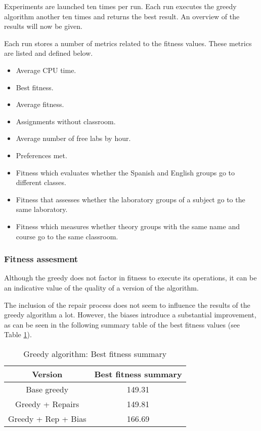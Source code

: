 Experiments are launched ten times per run. Each run executes the greedy algorithm another ten times and returns the best result. An overview of the results will now be given.


Each run stores a number of metrics related to the fitness values. These metrics are listed and defined below.

\begin{itemize}
    \item Average CPU time.
    \item Best fitness.
    \item Average fitness. 
    \item Assignments without classroom. 
    \item Average number of free labs by hour.
    \item Preferences met. 
    \item Fitness which evaluates whether the Spanish and English groups go to different classes.  
    \item Fitness that assesses whether the laboratory groups of a subject go to the same laboratory.
    \item Fitness which measures whether theory groups with the same name and course go to the same classroom.
\end{itemize}


\subsubsection{Fitness assesment}

Although the greedy does not factor in fitness to execute its operations, it can be an indicative value of the quality of a version of the algorithm.

The inclusion of the repair process does not seem to influence the results of the greedy algorithm a lot. However, the biases introduce a substantial improvement, as can be seen in the following summary table of the best fitness values (see Table \ref{table-fn-review}).


\begin{table}[H]
    \centering
    \caption{Greedy algorithm: Best fitness summary}
    \label{table-fn-review}
    \begin{tabular}{|c|c|}
        \hline
        \textbf{Version} & \textbf{Best fitness summary} \\
        \hline
        \rowcolor{blue!30}
        Base greedy & 149.31 \\
        \rowcolor{blue!10}
        Greedy + Repairs & 149.81 \\
        \rowcolor{blue!30}
        Greedy + Rep + Bias & 166.69 \\
        \hline
    \end{tabular}
\end{table}


